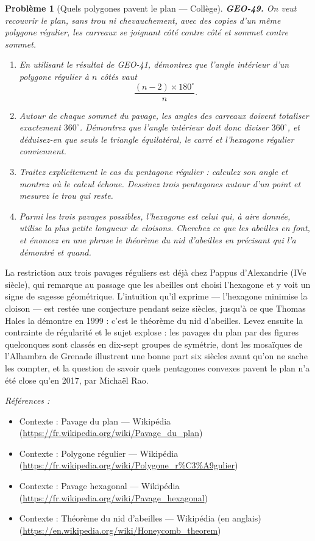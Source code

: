 \documentclass[11pt]{article}
\newtheorem{problem}{Problème}
\newenvironment{refs}{\par\small\noindent\emph{Références :}\begin{itemize}\setlength\itemsep{0pt}}{\end{itemize}\normalsize}
\begin{document}
\begin{problem}[{Quels polygones pavent le plan --- Collège}]
\textbf{GEO-49.} On veut recouvrir le plan, sans trou ni chevauchement, avec des copies d'un même
polygone régulier, les carreaux se joignant côté contre côté et sommet contre sommet.
\begin{enumerate}
\item[(a)] En utilisant le résultat de GEO-41, démontrez que l'angle intérieur d'un polygone régulier à
$ n $ côtés vaut
\[ \frac{(n-2) \times 180^\circ}{n} . \]
\item[(b)] Autour de chaque sommet du pavage, les angles des carreaux doivent totaliser exactement
$ 360^\circ $. Démontrez que l'angle intérieur doit donc diviser $ 360^\circ $, et déduisez-en que
seuls le triangle équilatéral, le carré et l'hexagone régulier conviennent.
\item[(c)] Traitez explicitement le cas du pentagone régulier : calculez son angle et montrez où le calcul
échoue. Dessinez trois pentagones autour d'un point et mesurez le trou qui reste.
\item[(d)] Parmi les trois pavages possibles, l'hexagone est celui qui, à aire donnée, utilise la plus petite
longueur de cloisons. Cherchez ce que les abeilles en font, et énoncez en une phrase le théorème du
nid d'abeilles en précisant qui l'a démontré et quand.
\end{enumerate}

\end{problem}

\noindent La restriction aux trois pavages réguliers est déjà chez Pappus d'Alexandrie
(IVe siècle), qui remarque au passage que les abeilles ont \og{} choisi \fg{} l'hexagone et y voit
un signe de sagesse géométrique. L'intuition qu'il exprime --- l'hexagone minimise la cloison --- est
restée une conjecture pendant seize siècles, jusqu'à ce que Thomas Hales la démontre en 1999 : c'est
le théorème du nid d'abeilles. Levez ensuite la contrainte de régularité et le sujet explose : les
pavages du plan par des figures quelconques sont classés en dix-sept groupes de symétrie, dont les
mosaïques de l'Alhambra de Grenade illustrent une bonne part six siècles avant qu'on ne sache les
compter, et la question de savoir quels pentagones convexes pavent le plan n'a été close qu'en 2017,
par Michaël Rao.

\begin{refs}
\item Contexte : Pavage du plan --- Wikipédia (\url{https://fr.wikipedia.org/wiki/Pavage_du_plan})
\item Contexte : Polygone régulier --- Wikipédia (\url{https://fr.wikipedia.org/wiki/Polygone_r%C3%A9gulier})
\item Contexte : Pavage hexagonal --- Wikipédia (\url{https://fr.wikipedia.org/wiki/Pavage_hexagonal})
\item Contexte : Théorème du nid d'abeilles --- Wikipédia (en anglais) (\url{https://en.wikipedia.org/wiki/Honeycomb_theorem})
\end{refs}
\end{document}

